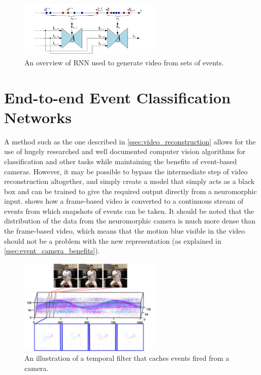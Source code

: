 \begin{figure}[htb]
      \centering
      \includegraphics[width=0.6\textwidth]{background/images/spikes_to_video_rnn.png}
      \caption{An overview of RNN used to generate video from sets of events\cite{spikingToVideo}.}
      \label{fig:spikes_to_video_rnn}
\end{figure}

\section{End-to-end Event Classification Networks}

A method such as the one described in \cref{ssec:video_reconstruction} allows for the use of hugely researched and well documented computer vision algorithms for classification and other tasks while maintaining the benefits of event-based cameras. However, it may be possible to bypass the intermediate step of video reconstruction altogether, and simply create a model that simply acts as a black box and can be trained to give the required output directly from a neuromorphic input.  shows how a frame-based video is converted to a continuous stream of events from which snapshots of events can be taken. It should be noted that the distribution of the data from the neuromorphic camera is much more dense than the frame-based video, which means that the motion blue visible in the video should not be a problem with the new representation (as explained in \cref{ssec:event_camera_benefits}).

\begin{figure}[htb]
      \centering
      \includegraphics[width=0.6\textwidth]{background/images/temporal_filter.png}
      \caption{An illustration of a temporal filter that caches events fired from a camera\cite{eventBasedGestureRec}.}
      \label{fig:temporal_filter}
\end{figure}

